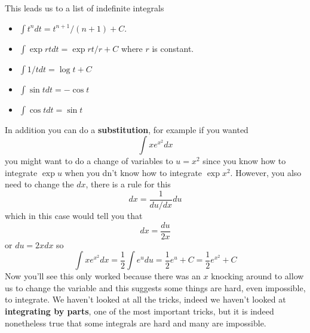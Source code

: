 \documentclass[12pt]{article}
\begin{document}
This leads us to a list of indefinite integrals
\begin{itemize}
\item $\int t^ndt =t^{n+1}/(n+1)+C$.
\item $\int \exp{rt}dt = \exp{rt}/r +C$ where $r$ is constant.
\item $\int 1/t{} dt = \log{t}+C$
\item $\int \sin{t} dt = -\cos{t}$
\item $\int \cos{t} dt = \sin{t}$
\end{itemize}

In addition you can do a \textbf{substitution}, for example if you wanted
\begin{equation}
  \int xe^{x^2}dx
\end{equation}
you might want to do a change of variables to $u=x^2$ since you know
how to integrate $\exp{u}$ when you dn't know how to integrate
$\exp{x^2}$. However, you also need to change the $dx$, there is a
rule for this
\begin{equation}
      dx=\frac{1}{du/dx}du
\end{equation}
which in this case would tell you that
\begin{equation}
  dx=\frac{du}{2x}
\end{equation}
or $du=2xdx$ so
\begin{equation}
  \int xe^{x^2}dx=\frac{1}{2}\int e^udu=\frac{1}{2}e^u+C=\frac{1}{2}e^{x^2}+C
\end{equation}
Now you'll see this only worked because there was an $x$ knocking
around to allow us to change the variable and this suggests some
things are hard, even impossible, to integrate. We haven't looked at
all the tricks, indeed we haven't looked at \textbf{integrating by
  parts}, one of the most important tricks, but it is indeed
nonetheless true that some integrals are hard and many are impossible.


  
\end{document}
